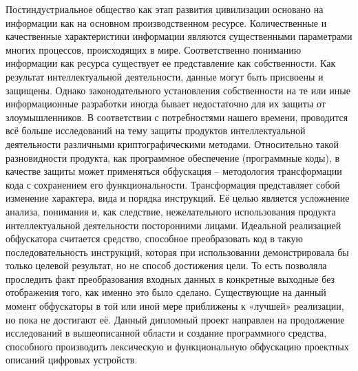\label{sec:intro}
Постиндустриальное общество как этап развития цивилизации основано на информации как на основном производственном ресурсе. Количественные и качественные характеристики информации являются существенными параметрами многих процессов, происходящих в мире.
Соответственно пониманию информации как ресурса существует ее представление как собственности. Как результат интеллектуальной деятельности, данные могут быть присвоены и защищены. Однако законодательного установления собственности на те или иные информационные разработки иногда бывает недостаточно для их защиты от злоумышленников. В соответствии с потребностями нашего времени, проводится всё больше исследований на тему защиты продуктов интеллектуальной деятельности различными криптографическими методами.
Относительно такой разновидности продукта, как программное обеспечение (программные коды), в качестве защиты может применяться обфускация – методология трансформации кода с сохранением его функциональности. Трансформация представляет собой изменение характера, вида и порядка инструкций. Её целью является усложнение анализа, понимания и, как следствие, нежелательного использования продукта интеллектуальной деятельности посторонними лицами.
Идеальной реализацией обфускатора считается средство, способное преобразовать код в такую последовательность инструкций, которая при использовании демонстрировала бы только целевой результат, но не способ достижения цели. То есть позволяла проследить факт преобразования входных данных в конкретные выходные без отображения того, как именно это было сделано.
Существующие на данный момент обфускаторы в той или иной мере приближены к «лучшей» реализации, но пока не достигают её.
Данный дипломный проект направлен на продолжение исследований в вышеописанной области и создание программного средства, способного производить лексическую и функциональную обфускацию проектных описаний цифровых устройств.